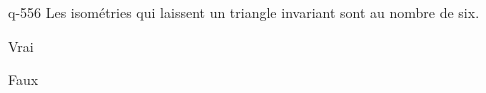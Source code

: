 \begin{truefalse}{q-556}
Les isométries qui laissent un triangle invariant sont au nombre de six.
\item Vrai
\item* Faux
\end{truefalse}

